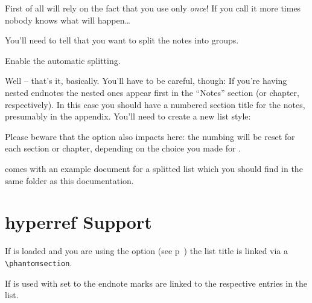 \documentclass[toc=bib,toc=index]{cnpkgdoc}
\begin{document}
First of all \enotez will rely on the fact that you use 
only \emph{once}! If you call it more times nobody knows what will happen\ldots

You'll need to tell \enotez that you want to split the notes into groups.
\begin{beschreibung}
   Enable the automatic splitting.
\end{beschreibung}
Well -- that's it, basically. You'll have to be careful, though:
If you're having nested endnotes the nested ones appear first in the ``Notes''
section (or chapter, respectively). In this case you should have a numbered
section title for the notes, presumably in the appendix. You'll need to create
a new list style:
\begin{beispiel}
 \usepackage{enotez}
 \appendix
 \printendnotes
\end{beispiel}

Please beware that the option  also impacts here: the numbing will
be reset for each section or chapter, depending on the choice you made for
.

\enotez comes with an example document for a splitted list which you should
find in the same folder as this documentation.

\section{hyperref Support}
If  is loaded and you are using the option  (see
p~\pageref{key:totoc}) the list title is linked via a \verb=\phantomsection=.

If  is used with  set to  the
endnote marks are linked to the respective entries in the list.

\clearpage
\printendnotes[addsec]

{\EmbracOff\printbibliography}


\printindex
\end{document}
